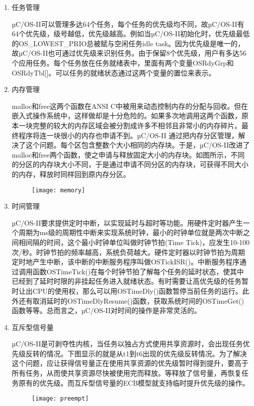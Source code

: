 \documentclass{ctexart}
\begin{document}
\begin{enumerate}
  \item 任务管理\par
    µC/OS-II可以管理多达64个任务，每个任务的优先级均不同，故µC/OS-II有64个优先级，级号越低，优先级越高。例如当µC/OS-II初始化时，优先级最低的OS\_LOWEST\_PRIO总被赋与空闲任务idle task。因为优先级是唯一的，故µC/OS-II也可通过优先级来识别任务。由于保留8个优先级，用户有多达56个应用任务。每个任务放在任务就绪表中，里面有两个变量OSRdyGrp和OSRdyTbl[]。可以任务的就绪状态通过这两个变量的置位来表示。
  \item 内存管理\par
    malloc和free这两个函数在ANSI C中被用来动态控制内存的分配与回收。但在嵌入式操作系统中，这样做却是十分危险的。如果多次地调用这两个函数，原本一块完整的较大的内存区域会被分割成许多不相邻且非常小的内存碎片。最终程序将连一块很小的内存也申请不到。µC/OS-II 通过把内存分区管理，解决了这个问题。每个区包含整数个大小相同的内存块。于是，µC/OS-II改进了malloc和free两个函数，使之申请与释放固定大小的内存块。如图所示，不同的分区的内存块大小不同，于是通过申请不同分区的内存块，可获得不同大小的内存，释放时同样回到原内存分区。\par
    \begin{figure}[h]
\centering
    \texttt{[image: memory]}
    \end{figure}
  \item 时间管理\par
    µC/OS-II要求提供定时中断，以实现延时与超时等功能。用硬件定时器产生一个周期为ms级的周期性中断来实现系统时钟，最小的时钟单位就是两次中断之间相间隔的时间，这个最小时钟单位叫做时钟节拍(Time Tick)，应发生10-100次/秒。时钟节拍的频率越高，系统负荷越大。硬件定时器以时钟节拍为周期定时地产生中断，该中断的中断服务程序叫做OSTickISR()。中断服务程序通过调用函数OSTimeTick()在每个时钟节拍了解每个任务的延时状态，使其中已经到了延时时限的非挂起任务进入就绪状态。有时需要让高优先级的任务暂时让出CPU的使用权，那么可以用OSTimeDly()函数暂停当前任务的运行。此外还有取消延时的OSTimeDlyResume()函数，获取系统时间的OSTimeGet()函数等等。总而言之，µC/OS-II对时间的操作是非常灵活的。
  \item 互斥型信号量\par
    µC/OS-II是可剥夺性内核，当任务以独占方式使用共享资源时，会出现任务优先级反转的情况。下图显示的就是从t1到t6出现的优先级反转情况。为了解决这个问题，应让获得信号量正在使用共享资源的优先级暂时得到提升，要高于所有任务，从而使共享资源尽快被使用完而释放。等释放了信号量，再恢复任务原有的优先级。而互斥型信号量的ECB模型就支持临时提升优先级的操作。\par
    \begin{figure}[h]
\centering
    \texttt{[image: preempt]}
    \end{figure}
\end{enumerate}
\end{document}
